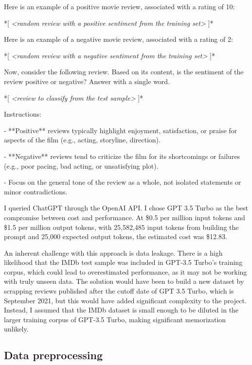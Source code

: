 \documentclass{article}
\begin{document}
\begin{displayquote}
Here is an example of a positive movie review, associated with a rating of 10:

*[ \textit{<random review with a positive sentiment from the training set>} ]*

Here is an example of a negative movie review, associated with a rating of 2:

*[ \textit{<random review with a negative sentiment from the training set>} ]*

Now, consider the following review. Based on its content, is the sentiment of the review positive or negative? Answer with a single word.

*[ \textit{<review to classify from the test sample>} ]*

Instructions:

- **Positive** reviews typically highlight enjoyment, satisfaction, or praise for aspects of the film (e.g., acting, storyline, direction).

- **Negative** reviews tend to criticize the film for its shortcomings or failures (e.g., poor pacing, bad acting, or unsatisfying plot).

- Focus on the general tone of the review as a whole, not isolated statements or minor contradictions.
\end{displayquote}

I queried ChatGPT through the OpenAI API. I chose GPT 3.5 Turbo as the best compromise between cost and performance. At \$0.5 per million input tokens and \$1.5 per million output tokens, with 25,582,485 input tokens from building the prompt and 25,000 expected output tokens, the estimated cost was \$12.83.

An inherent challenge with this approach is data leakage. There is a high likelihood that the IMDb test sample was included in GPT-3.5 Turbo's training corpus, which could lead to overestimated performance, as it may not be working with truly unseen data. The solution would have been to build a new dataset by scrapping reviews published after the cutoff date of GPT 3.5 Turbo, which is September 2021, but this would have added significant complexity to the project. Instead, I assumed that the IMDb dataset is small enough to be diluted in the larger training corpus of GPT-3.5 Turbo, making significant memorization unlikely.

\subsection{Data preprocessing}
\end{document}

